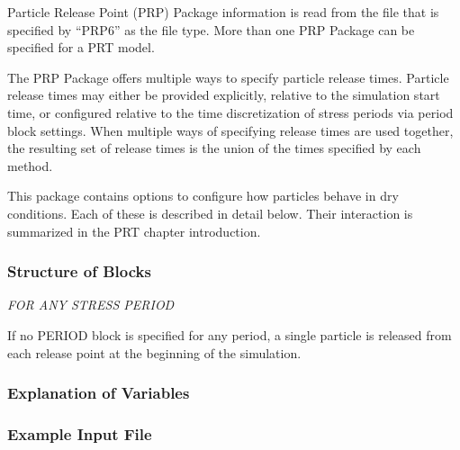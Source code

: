 Particle Release Point (PRP) Package information is read from the file that is specified by ``PRP6'' as the file type.  More than one PRP Package can be specified for a PRT model. 

The PRP Package offers multiple ways to specify particle release times.  Particle release times may either be provided explicitly, relative to the simulation start time, or configured relative to the time discretization of stress periods via period block settings.  When multiple ways of specifying release times are used together, the resulting set of release times is the union of the times specified by each method.

This package contains options to configure how particles behave in dry conditions. Each of these is described in detail below. Their interaction is summarized in the PRT chapter introduction.

\vspace{5mm}
\subsubsection{Structure of Blocks}




\vspace{5mm}
\noindent \textit{FOR ANY STRESS PERIOD}

\packageperioddescription \: If no PERIOD block is specified for any period, a single particle is released from each release point at the beginning of the simulation.

\vspace{5mm}
\subsubsection{Explanation of Variables}
\begin{description}

\end{description}

\vspace{5mm}
\subsubsection{Example Input File}


